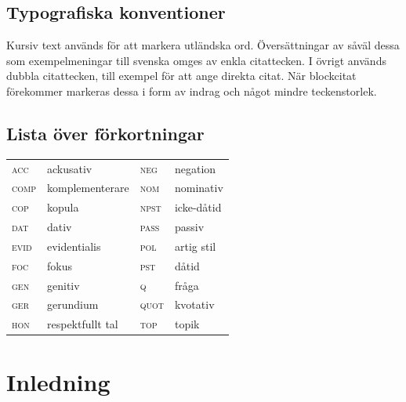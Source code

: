 \documentclass[12pt,a4paper]{article}
\begin{document}
\subsection*{Typografiska konventioner}
Kursiv text används för att markera utländska ord. Översättningar av såväl dessa som exempelmeningar till svenska omges av enkla citattecken. I övrigt används dubbla citattecken, till exempel för att ange direkta citat. När blockcitat förekommer markeras dessa i form av indrag och något mindre teckenstorlek.

\subsection*{Lista över förkortningar}
\begin{small}
\begin{tabular}{l p{3cm} l l}
\textsc{acc}  & ackusativ        & \textsc{neg}  & negation   \\
\textsc{comp} & komplementerare  & \textsc{nom}  & nominativ  \\
\textsc{cop}  & kopula           & \textsc{npst} & icke-dåtid \\
\textsc{dat}  & dativ            & \textsc{pass} & passiv     \\
\textsc{evid} & evidentialis     & \textsc{pol}  & artig stil \\
\textsc{foc}  & fokus            & \textsc{pst}  & dåtid      \\
\textsc{gen}  & genitiv          & \textsc{q}    & fråga      \\
\textsc{ger}  & gerundium        & \textsc{quot} & kvotativ   \\
\textsc{hon}  & respektfullt tal & \textsc{top}  & topik      \\
\end{tabular}
\end{small}




\clearpage
{}

\newpage
\section{Inledning}
\label{ch:Inledning}
\end{document}
